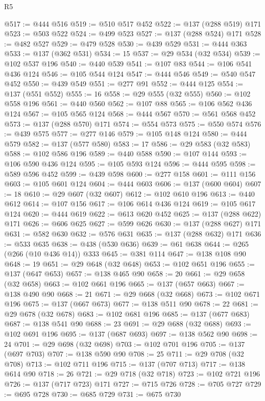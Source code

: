\begin{lexlean}{R5}
\begin{coremodule}
@517 := @444 @516
@519 := @510 @517 @452
@522 := @137 (@288 @519) @171
@523 := @503 @522
@524 := @499 @523
@527 := @137 (@288 @524) @171
@528 := @482 @527
@529 := @479 @528
@530 := @439 @529
@531 := @444 @363
@533 := @137 (@362 @531)
@534 := 15
@537 := @29 @534 (@32 @534)
@539 := @102 @537 @196
@540 := @440 @539
@541 := @107 @83
@544 := @106 @541 @436 @124
@546 := @105 @544 @124
@547 := @444 @546
@549 := @540 @547 @452
@550 := @439 @549
@551 := @277 @91
@552 := @444 @125
@554 := @137 (@551 @552)
@555 := 16
@558 := @29 @555 (@32 @555)
@560 := @102 @558 @196
@561 := @440 @560
@562 := @107 @88
@565 := @106 @562 @436 @124
@567 := @105 @565 @124
@568 := @444 @567
@570 := @561 @568 @452
@573 := @137 (@288 @570) @171
@574 := @554 @573
@575 := @550 @574
@576 := @439 @575
@577 := @277 @146
@579 := @105 @148 @124
@580 := @444 @579
@582 := @137 (@577 @580)
@583 := 17
@586 := @29 @583 (@32 @583)
@588 := @102 @586 @196
@589 := @440 @588
@590 := @107 @144
@593 := @106 @590 @436 @124
@595 := @105 @593 @124
@596 := @444 @595
@598 := @589 @596 @452
@599 := @439 @598
@600 := @277 @158
@601 := @111 @156
@603 := @105 @601 @124
@604 := @444 @603
@606 := @137 (@600 @604)
@607 := 18
@610 := @29 @607 (@32 @607)
@612 := @102 @610 @196
@613 := @440 @612
@614 := @107 @156
@617 := @106 @614 @436 @124
@619 := @105 @617 @124
@620 := @444 @619
@622 := @613 @620 @452
@625 := @137 (@288 @622) @171
@626 := @606 @625
@627 := @599 @626
@630 := @137 (@288 @627) @171
@631 := @582 @630
@632 := @576 @631
@635 := @137 (@288 @632) @171
@636 := @533 @635
@638 := @438 (@530 @636)
@639 := @61 @638
@644 := @265 (@266 (@10 @436 @14)) @333
@645 := @381 @114
@647 := @138 @108 @90
@648 := 19
@651 := @29 @648 (@32 @648)
@653 := @102 @651 @196
@655 := @137 (@647 @653)
@657 := @138 @465 @90
@658 := 20
@661 := @29 @658 (@32 @658)
@663 := @102 @661 @196
@665 := @137 (@657 @663)
@667 := @138 @490 @90
@668 := 21
@671 := @29 @668 (@32 @668)
@673 := @102 @671 @196
@675 := @137 (@667 @673)
@677 := @138 @511 @90
@678 := 22
@681 := @29 @678 (@32 @678)
@683 := @102 @681 @196
@685 := @137 (@677 @683)
@687 := @138 @541 @90
@688 := 23
@691 := @29 @688 (@32 @688)
@693 := @102 @691 @196
@695 := @137 (@687 @693)
@697 := @138 @562 @90
@698 := 24
@701 := @29 @698 (@32 @698)
@703 := @102 @701 @196
@705 := @137 (@697 @703)
@707 := @138 @590 @90
@708 := 25
@711 := @29 @708 (@32 @708)
@713 := @102 @711 @196
@715 := @137 (@707 @713)
@717 := @138 @614 @90
@718 := 26
@721 := @29 @718 (@32 @718)
@723 := @102 @721 @196
@726 := @137 (@717 @723) @171
@727 := @715 @726
@728 := @705 @727
@729 := @695 @728
@730 := @685 @729
@731 := @675 @730

\end{coremodule}
\end{lexlean}
